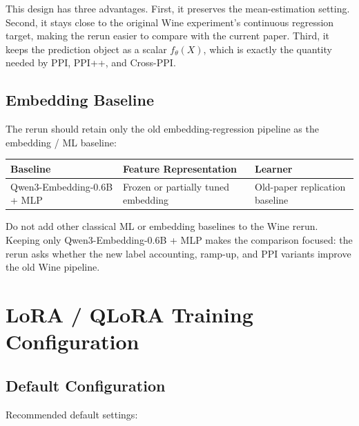 \documentclass[11pt]{article}
\begin{document}
This design has three advantages. First, it preserves the mean-estimation setting. Second, it stays close to the original Wine experiment's continuous regression target, making the rerun easier to compare with the current paper. Third, it keeps the prediction object as a scalar $f_\theta(X)$, which is exactly the quantity needed by PPI, PPI++, and Cross-PPI.

\subsection{Embedding Baseline}

The rerun should retain only the old embedding-regression pipeline as the embedding / ML baseline:

\begin{longtable}{p{}p{}p{}}
\toprule
Baseline & Feature Representation & Learner \\
\midrule
Qwen3-Embedding-0.6B + MLP & Frozen or partially tuned embedding & Old-paper replication baseline \\
\bottomrule
\end{longtable}

Do not add other classical ML or embedding baselines to the Wine rerun. Keeping only Qwen3-Embedding-0.6B + MLP makes the comparison focused: the rerun asks whether the new label accounting, ramp-up, and PPI variants improve the old Wine pipeline.

\section{LoRA / QLoRA Training Configuration}

\subsection{Default Configuration}

Recommended default settings:
\end{document}
